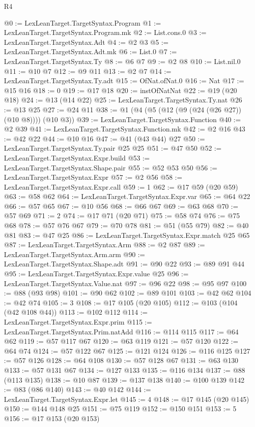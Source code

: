 \begin{lexlean}{R4}
\begin{coremodule}
{{{{{{{{{{{{{@0 := LexLeanTarget.TargetSyntax.Program
@1 := LexLeanTarget.TargetSyntax.Program.mk
@2 := List.cons.{0}
@3 := LexLeanTarget.TargetSyntax.Adt
@4 := @2 @3
@5 := LexLeanTarget.TargetSyntax.Adt.mk
@6 := List.{0}
@7 := LexLeanTarget.TargetSyntax.Ty
@8 := @6 @7
@9 := @2 @8
@10 := List.nil.{0}
@11 := @10 @7
@12 := @9 @11
@13 := @2 @7
@14 := LexLeanTarget.TargetSyntax.Ty.adt
@15 := OfNat.ofNat.{0}
@16 := Nat
@17 := @15 @16
@18 := 0
@19 := @17 @18
@20 := instOfNatNat
@22 := @19 (@20 @18)
@24 := @13 (@14 @22)
@25 := LexLeanTarget.TargetSyntax.Ty.nat
@26 := @13 @25
@27 := @24 @11
@38 := @1 (@4 (@5 (@12 (@9 (@24 (@26 @27)) (@10 @8)))) (@10 @3))
@39 := LexLeanTarget.TargetSyntax.Function
@40 := @2 @39
@41 := LexLeanTarget.TargetSyntax.Function.mk
@42 := @2 @16
@43 := @42 @22
@44 := @10 @16
@47 := @41 (@43 @44) @27
@50 := LexLeanTarget.TargetSyntax.Ty.pair @25 @25
@51 := @47 @50
@52 := LexLeanTarget.TargetSyntax.Expr.build
@53 := LexLeanTarget.TargetSyntax.Shape.pair
@55 := @52 @53 @50
@56 := LexLeanTarget.TargetSyntax.Expr
@57 := @2 @56
@58 := LexLeanTarget.TargetSyntax.Expr.call
@59 := 1
@62 := @17 @59 (@20 @59)
@63 := @58 @62
@64 := LexLeanTarget.TargetSyntax.Expr.var
@65 := @64 @22
@66 := @57 @65
@67 := @10 @56
@68 := @66 @67
@69 := @63 @68
@70 := @57 @69
@71 := 2
@74 := @17 @71 (@20 @71)
@75 := @58 @74
@76 := @75 @68
@78 := @57 @76 @67
@79 := @70 @78
@81 := @51 (@55 @79)
@82 := @40 @81
@83 := @47 @25
@86 := LexLeanTarget.TargetSyntax.Expr.match @25 @65
@87 := LexLeanTarget.TargetSyntax.Arm
@88 := @2 @87
@89 := LexLeanTarget.TargetSyntax.Arm.arm
@90 := LexLeanTarget.TargetSyntax.Shape.adt
@91 := @90 @22
@93 := @89 @91 @44
@95 := LexLeanTarget.TargetSyntax.Expr.value @25
@96 := LexLeanTarget.TargetSyntax.Value.nat
@97 := @96 @22
@98 := @95 @97
@100 := @88 (@93 @98)
@101 := @90 @62
@102 := @89 @101
@103 := @42 @62
@104 := @42 @74
@105 := 3
@108 := @17 @105 (@20 @105)
@112 := @103 (@104 (@42 @108 @44))
@113 := @102 @112
@114 := LexLeanTarget.TargetSyntax.Expr.prim
@115 := LexLeanTarget.TargetSyntax.Prim.natAdd
@116 := @114 @115
@117 := @64 @62
@119 := @57 @117 @67
@120 := @63 @119
@121 := @57 @120
@122 := @64 @74
@124 := @57 @122 @67
@125 := @121 @124
@126 := @116 @125
@127 := @57 @126
@128 := @64 @108
@130 := @57 @128 @67
@131 := @63 @130
@133 := @57 @131 @67
@134 := @127 @133
@135 := @116 @134
@137 := @88 (@113 @135)
@138 := @10 @87
@139 := @137 @138
@140 := @100 @139
@142 := @83 (@86 @140)
@143 := @40 @142
@144 := LexLeanTarget.TargetSyntax.Expr.let
@145 := 4
@148 := @17 @145 (@20 @145)
@150 := @144 @148 @25
@151 := @75 @119
@152 := @150 @151
@153 := 5
@156 := @17 @153 (@20 @153)
}}}}}}}}}}}}}
\end{coremodule}
\end{lexlean}
